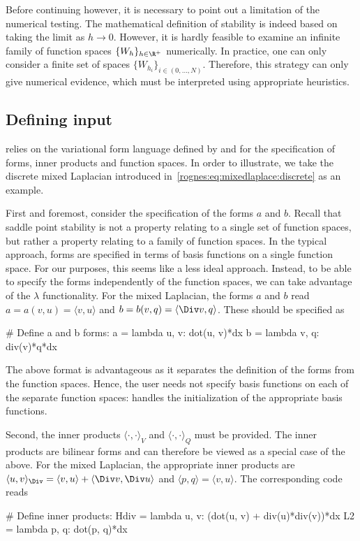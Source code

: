 Before continuing however, it is necessary to point out a limitation
of the numerical testing. The mathematical definition of stability is
indeed based on taking the limit as $h \rightarrow 0$. However, it is
hardly feasible to examine an infinite family of function spaces
$\{W_h\}_{h \in \R^{+}}$ numerically. In practice, one can only
consider a finite set of spaces $\{W_{h_i}\}_{i \in (0, \dots,
  N)}$. Therefore, this strategy can only give numerical evidence,
which must be interpreted using appropriate heuristics.

\subsection{Defining input}
\label{rognes:subsec:input}

\ascot{} relies on the variational form language defined by \ufl{} and
\pydolfin{} for the specification of forms, inner products and
function spaces.  In order to illustrate, we take the discrete mixed
Laplacian introduced in~\eqref{rognes:eq:mixedlaplace:discrete} as an
example.

First and foremost, consider the specification of the forms $a$ and
$b$. Recall that saddle point stability is not a property relating to
a single set of function spaces, but rather a property relating to a
family of function spaces. In the typical \pydolfin{} approach, forms
are specified in terms of basis functions on a single function
space. For our purposes, this seems like a less ideal
approach. Instead, to be able to specify the forms independently of
the function spaces, we can take advantage of the \pythonlang{}
$\lambda$ functionality. For the mixed Laplacian, the forms $a$ and
$b$ read $a = a(v, u) = \langle v, u \rangle$ and $b = b(v, q) =
\langle \Div v, q \rangle$. These should be specified as
\begin{python}
  # Define a and b forms:
  a = lambda u, v: dot(u, v)*dx
  b = lambda v, q: div(v)*q*dx
\end{python}
The above format is advantageous as it separates the definition of the
forms from the function spaces. Hence, the user needs not specify
basis functions on each of the separate function spaces: \ascot{}
handles the initialization of the appropriate basis functions.

Second, the inner products $\langle \cdot, \cdot \rangle_V$ and
$\langle \cdot, \cdot \rangle_Q$ must be provided. The inner products
are bilinear forms and can therefore be viewed as a special case of
the above. For the mixed Laplacian, the appropriate inner products are
$\langle u, v \rangle_{\Div} = \langle v, u \rangle + \langle \Div v,
\Div u \rangle$ and $\langle p, q \rangle = \langle v, u \rangle$. The
corresponding code reads
\begin{python}
  # Define inner products:
  Hdiv = lambda u, v: (dot(u, v) + div(u)*div(v))*dx
  L2 = lambda p, q: dot(p, q)*dx
\end{python}

